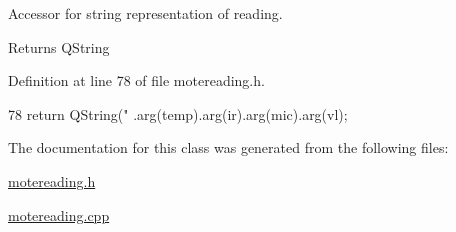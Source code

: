 Accessor for string representation of reading. 

\begin{DoxyReturn}{Returns}
QString 
\end{DoxyReturn}


Definition at line 78 of file motereading.h.




\begin{DoxyCode}
78 { return QString("%
      .arg(temp).arg(ir).arg(mic).arg(vl); }
\end{DoxyCode}




The documentation for this class was generated from the following files:\begin{DoxyCompactItemize}
\item 
\hyperlink{motereading_8h}{motereading.h}\item 
\hyperlink{motereading_8cpp}{motereading.cpp}\end{DoxyCompactItemize}
